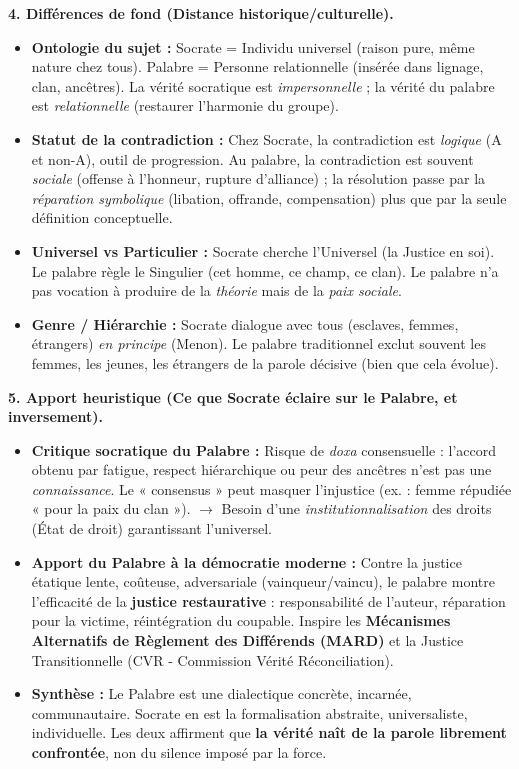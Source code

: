 \documentclass[11pt]{article}
\newcommand{\cle}[1]{{\popxbold\color{popdark}#1}}
\begin{document}
\begin{exoresolu}
\textbf{4. Différences de fond (Distance historique/culturelle).}
\begin{itemize}
    \item \textbf{Ontologie du sujet :} Socrate = \cle{Individu} universel (raison pure, même nature chez tous). Palabre = \cle{Personne relationnelle} (insérée dans lignage, clan, ancêtres). La vérité socratique est \emph{impersonnelle} ; la vérité du palabre est \emph{relationnelle} (restaurer l'harmonie du groupe).
    \item \textbf{Statut de la contradiction :} Chez Socrate, la contradiction est \emph{logique} (A et non-A), outil de progression. Au palabre, la contradiction est souvent \emph{sociale} (offense à l'honneur, rupture d'alliance) ; la résolution passe par la \emph{réparation symbolique} (libation, offrande, compensation) plus que par la seule définition conceptuelle.
    \item \textbf{Universel vs Particulier :} Socrate cherche l'\cle{Universel} (la Justice en soi). Le palabre règle le \cle{Singulier} (cet homme, ce champ, ce clan). Le palabre n'a pas vocation à produire de la \emph{théorie} mais de la \emph{paix sociale}.
    \item \textbf{Genre / Hiérarchie :} Socrate dialogue avec tous (esclaves, femmes, étrangers) \emph{en principe} (Menon). Le palabre traditionnel exclut souvent les femmes, les jeunes, les étrangers de la parole décisive (bien que cela évolue).
\end{itemize}

\textbf{5. Apport heuristique (Ce que Socrate éclaire sur le Palabre, et inversement).}
\begin{itemize}
    \item \textbf{Critique socratique du Palabre :} Risque de \emph{doxa} consensuelle : l'accord obtenu par fatigue, respect hiérarchique ou peur des ancêtres n'est pas une \emph{connaissance}. Le « consensus » peut masquer l'injustice (ex. : femme répudiée « pour la paix du clan »). $\rightarrow$ Besoin d'une \emph{institutionnalisation} des droits (État de droit) garantissant l'universel.
    \item \textbf{Apport du Palabre à la démocratie moderne :} Contre la justice étatique lente, coûteuse, adversariale (vainqueur/vaincu), le palabre montre l'efficacité de la \textbf{justice restaurative} : responsabilité de l'auteur, réparation pour la victime, réintégration du coupable. Inspire les \textbf{Mécanismes Alternatifs de Règlement des Différends (MARD)} et la \cle{Justice Transitionnelle} (CVR - Commission Vérité Réconciliation).
    \item \textbf{Synthèse :} Le Palabre est une \cle{dialectique concrète, incarnée, communautaire}. Socrate en est la \cle{formalisation abstraite, universaliste, individuelle}. Les deux affirment que \textbf{la vérité naît de la parole librement confrontée}, non du silence imposé par la force.
\end{itemize}


\end{exoresolu}
\end{document}
